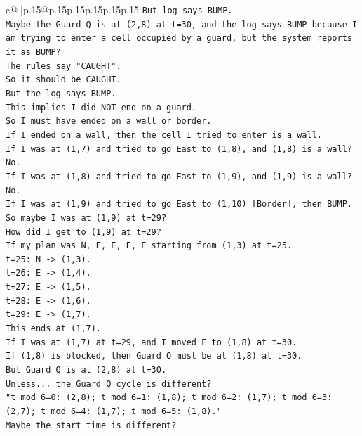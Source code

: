 \documentclass{article}
\begin{document}
{\begin{supertabular}{c@{$\;$}|p{.15\linewidth}@{}p{.15\linewidth}p{.15\linewidth}p{.15\linewidth}p{.15\linewidth}p{.15\linewidth}}
{{{\texttt{But log says BUMP.} \\
\texttt{Maybe the Guard Q is at (2,8) at t=30, and the log says BUMP because I am trying to enter a cell occupied by a guard, but the system reports it as BUMP?} \\
\texttt{The rules say "CAUGHT".} \\
\texttt{So it should be CAUGHT.} \\
\texttt{But the log says BUMP.} \\
\texttt{This implies I did NOT end on a guard.} \\
\texttt{So I must have ended on a wall or border.} \\
\texttt{If I ended on a wall, then the cell I tried to enter is a wall.} \\
\texttt{If I was at (1,7) and tried to go East to (1,8), and (1,8) is a wall?} \\
\texttt{No.} \\
\texttt{If I was at (1,8) and tried to go East to (1,9), and (1,9) is a wall?} \\
\texttt{No.} \\
\texttt{If I was at (1,9) and tried to go East to (1,10) {[}Border{]}, then BUMP.} \\
\texttt{So maybe I was at (1,9) at t=29?} \\
\texttt{How did I get to (1,9) at t=29?} \\
\texttt{If my plan was N, E, E, E, E starting from (1,3) at t=25.} \\
\texttt{t=25: N {-}> (1,3).} \\
\texttt{t=26: E {-}> (1,4).} \\
\texttt{t=27: E {-}> (1,5).} \\
\texttt{t=28: E {-}> (1,6).} \\
\texttt{t=29: E {-}> (1,7).} \\
\texttt{This ends at (1,7).} \\
\texttt{If I was at (1,7) at t=29, and I moved E to (1,8) at t=30.} \\
\texttt{If (1,8) is blocked, then Guard Q must be at (1,8) at t=30.} \\
\texttt{But Guard Q is at (2,8) at t=30.} \\
\texttt{Unless... the Guard Q cycle is different?} \\
\texttt{"t mod 6=0: (2,8); t mod 6=1: (1,8); t mod 6=2: (1,7); t mod 6=3: (2,7); t mod 6=4: (1,7); t mod 6=5: (1,8)."} \\
\texttt{Maybe the start time is different?} \\
}}}
\end{supertabular}}
\end{document}
